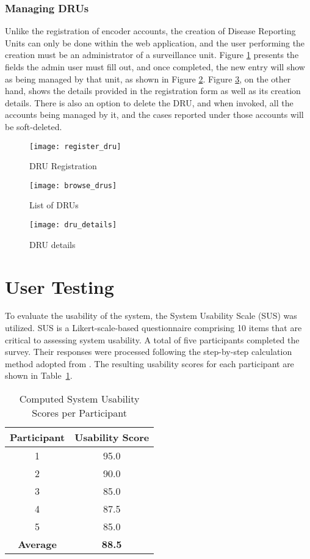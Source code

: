 \subsubsection{Managing DRUs}

Unlike the registration of encoder accounts, the creation of Disease Reporting Units can only be done within the web application, and the user performing the creation must be an administrator of a surveillance unit. Figure \ref{fig:register_dru} presents the fields the admin user must fill out, and once completed, the new entry will show as being managed by that unit, as shown in Figure \ref{fig:browse_drus}. Figure \ref{fig:dru_details}, on the other hand, shows the details provided in the registration form as well as its creation details. There is also an option to delete the DRU, and when invoked, all the accounts being managed by it, and the cases reported under those accounts will be soft-deleted.

\begin{figure}[H]
	\centering
	\texttt{[image: register\_dru]}
	\caption{DRU Registration}
	\label{fig:register_dru}
\end{figure}
\begin{figure}[H]
	\centering
	\texttt{[image: browse\_drus]}
	\caption{List of DRUs}
	\label{fig:browse_drus}
\end{figure}
\begin{figure}[H]
	\centering
	\texttt{[image: dru\_details]}
	\caption{DRU details}
	\label{fig:dru_details}
\end{figure}


\section{User Testing}
To evaluate the usability of the system, the System Usability Scale (SUS) was utilized. SUS is a Likert-scale-based questionnaire comprising 10 items that are critical to assessing system usability. A total of five participants completed the survey. Their responses were processed following the step-by-step calculation method adopted from \cite{babich_sus_usability_website}. The resulting usability scores for each participant are shown in Table~\ref{tab:sus_scores}.

\begin{table}[h!]
	\centering
	\begin{tabular}{|c|c|}
		\hline
		\textbf{Participant} & \textbf{Usability Score} \\
		\hline
		1 & 95.0 \\
		2 & 90.0 \\
		3 & 85.0 \\
		4 & 87.5 \\
		5 & 85.0 \\
		\hline
		\textbf{Average} & \textbf{88.5} \\
		\hline
	\end{tabular}
	\caption{Computed System Usability Scores per Participant}
	\label{tab:sus_scores}
\end{table}

